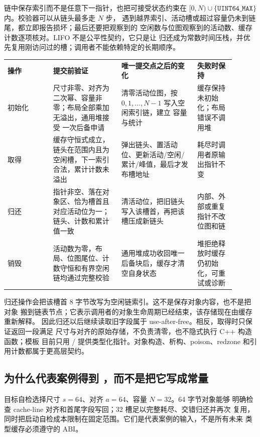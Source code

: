 链中保存索引而不是任意下一指针，也把可接受状态约束在
\([0,N)\cup\{\mathtt{UINT64\_MAX}\}\) 内。校验器可以从链头最多走 \(N\) 步，
遇到越界索引、活动槽或超过容量仍未到链尾，都立即报告损坏；最后还要把观察到的
空闲数与位图观察到的活动数、缓存计数逐项核对。LIFO 不是公平性契约，它只是让
归还成为常数时间压栈，并优先复用刚访问过的槽；调用者不能依赖特定的长期顺序。

\begin{longtable}{|L{0.18\linewidth}|L{0.27\linewidth}|L{0.30\linewidth}|L{0.15\linewidth}|}
\hline
{}
\textbf{操作} & \textbf{提交前验证} & \textbf{唯一提交点之后的变化} &
\textbf{失败时保持} \\\tablerowrule
\endhead
初始化 & 尺寸非零、对齐为二次幂、容量非零；布局全部乘加无溢出，通用堆接受
一次后备申请 & 清零活动位图，按 \(0,1,\ldots,N-1\) 写入空闲索引链，建立
容量与统计 & 缓存保持未初始化；布局错误不调用堆 \\\tablerowrule
取得 & 缓存守恒式成立，链头在范围内且为空闲槽，下一索引合法，累计计数未溢出 &
弹出链头、置活动位、更新活动/空闲/累计/峰值，最后才发布槽地址 &
耗尽时调用者原输出指针不变 \\\tablerowrule
归还 & 指针非空、落在对象区、恰为槽首且对应活动位为一；链头、计数和累计值一致 &
清活动位，把旧链头写入该槽首，再把该槽压成新链头 &
内部、外部或重复指针不改位图和链 \\\tablerowrule
销毁 & 活动数为零，布局、位图尾位、计数守恒和有界空闲链均通过完整校验 &
通用堆成功收回唯一后备块后，缓存才清空自身状态 &
堆拒绝释放时缓存仍初始化，可重试或诊断 \\\hline
\end{longtable}

归还操作会把该槽首 8 字节改写为空闲链索引。这不是保存对象内容，也不是把对象
搬到链表节点；它表示调用者的对象生命周期已经结束，该存储现在由缓存重新解释。
因此归还以后继续读取旧字段属于 use-after-free。相反，取得时只保证返回一段满足
尺寸与对齐的原始存储，不负责清零，也不隐式执行 C++ 构造函数；模板
 目前只用 /
提供类型化指针。对象构造、析构、poison、redzone 和引用计数都属于更高层契约。

\subsection{为什么代表案例得到 ，而不是把它写成常量}

目标自检选择尺寸 \(s=64\)、对齐 \(a=64\)、容量 \(N=32\)。64 字节对象能够
明确检查 cache-line 对齐和首尾字段写回；32 槽足以完整耗尽、交错归还并再次
复用，同时把启动自检成本限制在固定范围。它们是代表案例的输入，不是所有未来
类型缓存必须遵守的 ABI。

